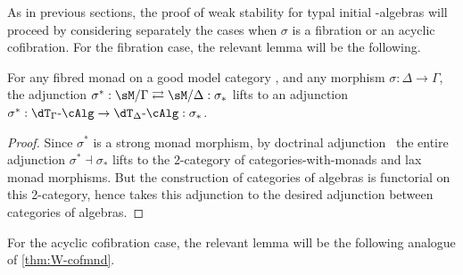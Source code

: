 \documentclass{amsart}
\def\alg{\text{-}\cAlg}
\begin{document}
As in previous sections, the proof of weak stability for typal initial \dT-algebras will proceed by considering separately the cases when $\sigma$ is a fibration or an acyclic cofibration.
For the fibration case, the relevant lemma will be the following.

\begin{lem}\label{thm:fibmnd-radj}
  For any fibred monad \dT on a good model category \sM, and any morphism $\sigma:\Delta\to\Gamma$, the adjunction $\sigma^*: \sM/\Gamma \toot \sM/\Delta : \sigma_*$ lifts to an adjunction $\sigma^*:\dT_\Gamma\alg \to \dT_\Delta\alg: \sigma_*$.
\end{lem}
\begin{proof}
  Since $\sigma^*$ is a strong monad morphism, by doctrinal adjunction~\cite{kelly:doc-adjn} the entire adjunction $\sigma^*\dashv\sigma_*$ lifts to the 2-category of categories-with-monads and lax monad morphisms.
  But the construction of categories of algebras is functorial on this 2-category, hence takes this adjunction to the desired adjunction between categories of algebras.
\end{proof}

For the acyclic cofibration case, the relevant lemma will be the following analogue of \cref{thm:W-cofmnd}.
\end{document}
